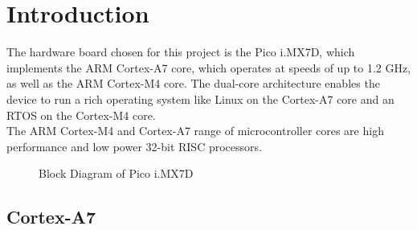 \documentclass{article}
\begin{document}
\thispagestyle{empty}
\newpage


\graphicspath{{assets/}} %

\pagebreak

\newpage

\setcounter{page}{1} 


\section{Introduction}\label{section:intro}

The hardware board chosen for this project is the Pico i.MX7D, which implements the ARM Cortex-A7 core, which operates at speeds of up to 1.2 GHz, as well as the ARM Cortex-M4 core. The dual-core
architecture enables the device to run a rich operating system like Linux on the Cortex-A7 core and an RTOS
on the Cortex-M4 core.\\
\newline
The ARM Cortex-M4 and Cortex-A7 range of microcontroller cores are high performance and
low power 32-bit RISC processors.

\begin{figure}[H]
  \caption{ Block Diagram of Pico i.MX7D}
  \label{block-diag}
\end{figure}

\subsection{Cortex-A7} \label{subsection:Cortex-A7}
\end{document}
